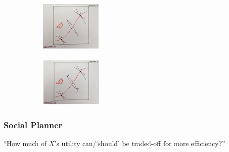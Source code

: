 \documentclass[11pt, english]{article}
\begin{document}
\begin{figure}[H]
\begin{center}
\begin{subfigure}[t]{4cm}
\begin{center}
		\end{center}
                \end{subfigure}
                \begin{subfigure}[t]{4cm}
                \begin{center}
                        \includegraphics[width=3cm,height=2.5cm]{EC315-IMG/26.png}
                \end{center}
                \end{subfigure}
                \begin{subfigure}[t]{4cm}
                \begin{center}
                        \includegraphics[width=3cm,height=2.5cm]{EC315-IMG/27.png}
                \end{center}
                \end{subfigure}
        \end{center}
        \end{figure}

		\subsubsection{Social Planner}

	``How much of $X$'s utility can/`should' be traded-off for more efficiency?''
\end{document}
